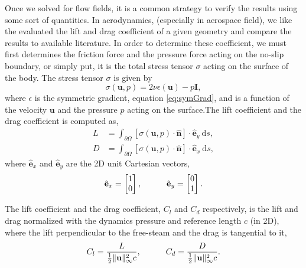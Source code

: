 Once we solved for flow fields, it is a common strategy to verify the results using some sort of quantities. In aerodynamics, (especially in aerospace field), we like the evaluated the lift and drag coefficient of a given geometry and compare the results to available literature. In order to determine these coefficient, we must first determines the 
friction force and the pressure force acting on the no-slip boundary, or simply put, it is the total stress tensor $\sigma$ acting on the surface of the body. The stress tensor $\sigma$ is given by
	\begin{equation}
	\sigma(\mathbf{u},p) = 2\nu\epsilon(\mathbf{u}) - p\mathbf{I},
	\end{equation}
where $\epsilon$ is the symmetric gradient, equation \ref{eq:symGrad}, and is a function of the velocity $\mathbf{u}$ and the pressure $p$ acting on the surface.The lift coefficient and the drag coefficient is computed as,
	\begin{subequations}
	\begin{align}
	L &= \int_{\partial \Omega} \left[\sigma(\mathbf{u},p) \cdot \hat{\mathbf{n}}\right]\cdot \hat{\mathbf{e}}_y\ \mathrm{d}s,\\
	D &= \int_{\partial \Omega} \left[\sigma(\mathbf{u},p) \cdot \hat{\mathbf{n}}\right]\cdot \hat{\mathbf{e}}_x\ \mathrm{d}s,
	\end{align}
	\end{subequations}
where $\hat{\mathbf{e}}_x$ and $\hat{\mathbf{e}}_y$ are the 2D unit Cartesian vectors,
	\begin{equation}
	\hat{\mathbf{e}}_x = \begin{bmatrix}
	 1 \\ 
	 0 
	\end{bmatrix}, \qquad \quad 
	\hat{\mathbf{e}}_y = \begin{bmatrix}
		 0 \\ 
		 1 
		\end{bmatrix}.\\
	\end{equation}

The lift coefficient and the drag coefficient, $C_l$ and $C_d$ respectively, is the lift and drag normalized with the dynamics pressure and reference length $c$ (in 2D), where the lift perpendicular to the free-steam and the drag is tangential to it,
		\begin{equation}
		C_l = \frac{L}{\frac{1}{2}\lVert\mathbf{u}\rVert_{\infty}^2 c},\qquad \quad
		C_d = \frac{D}{\frac{1}{2}\lVert\mathbf{u}\rVert_{\infty}^2 c}.\\
		\end{equation}


